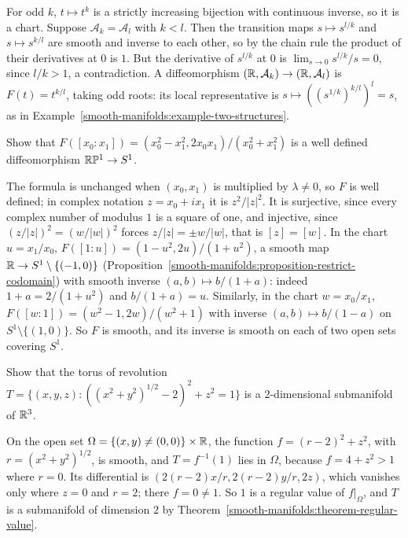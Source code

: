 \begin{solution}
For odd $k$, $t \mapsto t^k$ is a strictly increasing bijection with continuous inverse, so it is a chart. Suppose $\mathcal{A}_k = \mathcal{A}_l$ with $k < l$.
Then the transition maps $s \mapsto s^{l/k}$ and $s \mapsto s^{k/l}$ are smooth and inverse to each other, so by the chain rule the product of their derivatives
at $0$ is $1$. But the derivative of $s^{l/k}$ at $0$ is $\lim_{s \to 0}s^{l/k}/s = 0$, since $l/k > 1$, a contradiction. A diffeomorphism
$(\mathbb{R}, \mathcal{A}_k) \to (\mathbb{R}, \mathcal{A}_l)$ is $F(t) = t^{k/l}$, taking odd roots: its local representative is $s \mapsto ((s^{1/k})^{k/l})^l = s$, as in
Example~\ref{smooth-manifolds:example-two-structures}.
\end{solution}

\begin{exercise}\label{smooth-manifolds:exercise-rp1-circle}
Show that $F([x_0 : x_1]) = (x_0^2 - x_1^2, 2x_0x_1)/(x_0^2 + x_1^2)$ is a well defined diffeomorphism $\mathbb{R}\mathbb{P}^1 \to S^1$.
\end{exercise}

\begin{solution}
The formula is unchanged when $(x_0, x_1)$ is multiplied by $\lambda \neq 0$, so $F$ is well defined; in complex notation $z = x_0 + ix_1$ it is
$z^2/|z|^2$. It is surjective, since every complex number of modulus $1$ is a square of one, and injective, since $(z/|z|)^2 = (w/|w|)^2$ forces
$z/|z| = \pm w/|w|$, that is $[z] = [w]$. In the chart $u = x_1/x_0$, $F([1 : u]) = (1 - u^2, 2u)/(1 + u^2)$, a smooth map $\mathbb{R} \to S^1 \setminus \{(-1, 0)\}$
(Proposition~\ref{smooth-manifolds:proposition-restrict-codomain}) with smooth inverse $(a, b) \mapsto b/(1 + a)$: indeed $1 + a = 2/(1 + u^2)$ and
$b/(1 + a) = u$. Similarly, in the chart $w = x_0/x_1$, $F([w : 1]) = (w^2 - 1, 2w)/(w^2 + 1)$ with inverse $(a, b) \mapsto b/(1 - a)$ on
$S^1 \setminus \{(1, 0)\}$. So $F$ is smooth, and its inverse is smooth on each of two open sets covering $S^1$.
\end{solution}

\begin{exercise}\label{smooth-manifolds:exercise-torus-revolution}
Show that the torus of revolution $T = \{(x, y, z) : ((x^2 + y^2)^{1/2} - 2)^2 + z^2 = 1\}$ is a $2$-dimensional submanifold of $\mathbb{R}^3$.
\end{exercise}

\begin{solution}
On the open set $\Omega = \{(x, y) \neq (0, 0)\} \times \mathbb{R}$, the function $f = (r - 2)^2 + z^2$, with $r = (x^2 + y^2)^{1/2}$, is smooth, and $T = f^{-1}(1)$ lies
in $\Omega$, because $f = 4 + z^2 > 1$ where $r = 0$. Its differential is $(2(r - 2)x/r, 2(r - 2)y/r, 2z)$, which vanishes only where $z = 0$ and $r = 2$; there
$f = 0 \neq 1$. So $1$ is a regular value of $f|_\Omega$, and $T$ is a submanifold of dimension $2$ by Theorem~\ref{smooth-manifolds:theorem-regular-value}.
\end{solution}

